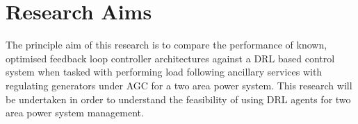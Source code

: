 \section{Research Aims}
The principle aim of this research is to compare the performance of known, optimised feedback loop controller architectures against a DRL based control system when tasked with performing load following ancillary services with regulating generators under AGC for a two area power system. This research will be undertaken in order to understand the feasibility of using DRL agents for two area power system management.